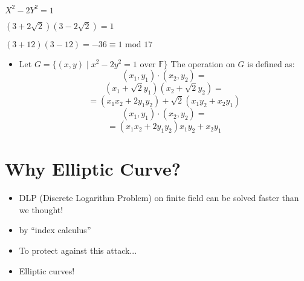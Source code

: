 \( X^2 - 2Y^2 = 1 \)

\( (3 + 2 \sqrt{2})(3 - 2 \sqrt{2}) = 1 \)

\( (3 + 12)(3 - 12) = -36 \equiv 1 \text{ mod 17} \)



\begin{itemize}
	\item 
	Let \( G = \{(x, y) \mid x^2 - 2y^2 = 1 \text{ over } \mathbb{F}\} \) The operation on \( G \) is defined as:
	\[
	(x_1, y_1) \cdot (x_2, y_2) =
	\]
	\[
	\left( x_1 + \sqrt{2} y_1 \right) \left( x_2 + \sqrt{2} y_2 \right) =
	\]
	\[
	= \left( x_1 x_2 + 2y_1 y_2 \right) + \sqrt{2} \left( x_1 y_2 + x_2 y_1 \right)
	\]
	\[
	(x_1, y_1) \cdot (x_2, y_2) =
	\]
	\[
	= \left( x_1 x_2 + 2y_1 y_2 \right) x_1 y_2 + x_2 y_1
	\]
\end{itemize}

\section*{Why Elliptic Curve?}

\begin{itemize}
	\item DLP (Discrete Logarithm Problem) on finite field can be solved faster than we thought!
	\item by ``index calculus''
	\item To protect against this attack...
	\item Elliptic curves!
\end{itemize}



\newpage
{}


